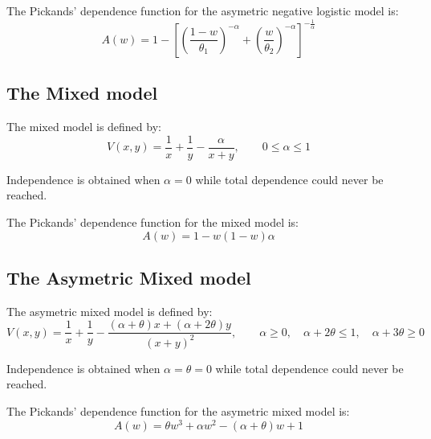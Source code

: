 \documentclass[11pt,a4paper]{article}
\numberwithin{equation}{section}
\theoremstyle{definition}
\begin{document}
The Pickands' dependence function for the asymetric negative logistic
model is:
\begin{displaymath}
  A(w) = 1 - \left[ \left(\frac{1 - w}{\theta_1} \right)^{-\alpha} + 
    \left(\frac{w}{\theta_2} \right)^{-\alpha}
  \right]^{-\frac{1}{\alpha}}
\end{displaymath}

\subsection{The Mixed model}

The mixed model is defined by:
\begin{displaymath}
  V(x,y) = \frac{1}{x} + \frac{1}{y} - \frac{\alpha}{x+y}, \qquad 0
  \leq \alpha \leq 1
\end{displaymath}

Independence is obtained when $\alpha = 0$ while total dependence
could never be reached.

The Pickands' dependence function for the mixed model is:
\begin{displaymath}
  A(w) = 1 - w  \left(1 -w\right) \alpha
\end{displaymath}

\subsection{The Asymetric Mixed model}

The asymetric mixed model is defined by:
\begin{displaymath}
  V(x,y) = \frac{1}{x} + \frac{1}{y} - \frac{\left( \alpha + \theta
    \right) x + \left(\alpha + 2\theta \right) y}{\left( x+ y
    \right)^2}, \qquad \alpha \geq 0,\quad \alpha + 2 \theta \leq 1,
  \quad  \alpha + 3\theta \geq 0
\end{displaymath}

Independence is obtained when $\alpha = \theta = 0$ while total
dependence could never be reached.

The Pickands' dependence function for the asymetric mixed model is:
\begin{displaymath}
  A(w) = \theta w^3 + \alpha w^2 - \left(\alpha + \theta \right) w +
  1
\end{displaymath}



\end{document}
